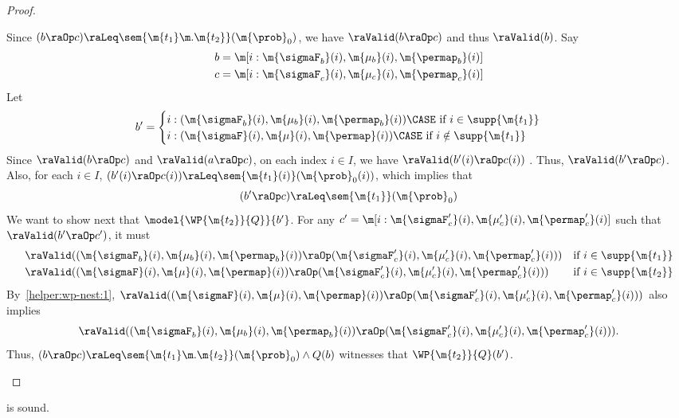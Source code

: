 \documentclass[acmsmall,nonacm,screen,appendix]{acmart}
\begin{document}
\begin{proof}
\begin{itemize}
      Since $(b \raOp c) \raLeq \sem{\m{t_1} \m. \m{t_2}}(\m{\prob}_0)
      $, we have $\raValid(b \raOp c)$ and thus $\raValid(b)$. Say
      \begin{align*}
        b &= \m[i: \m{\sigmaF_b}(i), \m{\mu_b}(i), \m{\permap_b}(i)] \\
        c &= \m[i: \m{\sigmaF_c}(i), \m{\mu_c}(i), \m{\permap_c}(i)]
\end{align*}
      Let
      \begin{align*}
        b' &=
        \begin{cases}
          i:  (\m{\sigmaF_b}(i), \m{\mu_b}(i), \m{\permap_b}(i)) \CASE \text{ if $i \in \supp{\m{t_1}}$} \\
          i : (\m{\sigmaF}(i), \m{\mu}(i), \m{\permap}(i)) \CASE \text{ if $i \notin \supp{\m{t_1}}$ }
        \end{cases}
      \end{align*}
      Since $\raValid(b \raOp c)$ and  $\raValid(a \raOp c)$,
      on each index $i \in I$, we have $\raValid(b'(i) \raOp c(i))$  .
      Thus, $\raValid(b' \raOp c)$.
      Also, for each $i \in I$,
      $(b'(i) \raOp c(i)) \raLeq \sem{\m{t_1}(i)}(\m{\prob}_0(i))$,
      which implies that
      \[
          (b' \raOp c) \raLeq \sem{\m{t_1}}(\m{\prob}_0)
      \]
      We want to show next that
      $\model{\WP {\m{t_2}} {Q}}{b'}$.
      For any $c' = \m[i: \m{\sigmaF'_c}(i), \m{\mu'_c}(i), \m{\permap'_c}(i)]$
      such that $\raValid(b' \raOp c')$,
      it must
      \begin{align*}
        &\raValid((\m{\sigmaF_b}(i), \m{\mu_b}(i), \m{\permap_b}(i)) \raOp (\m{\sigmaF'_c}(i), \m{\mu'_c}(i), \m{\permap'_c}(i)))  &\text{if } i \in \supp{\m{t_1}} \\
        &\raValid((\m{\sigmaF}(i), \m{\mu}(i), \m{\permap}(i)) \raOp (\m{\sigmaF'_c}(i), \m{\mu'_c}(i), \m{\permap'_c}(i)))  &\text{if } i  \in \supp{\m{t_2}}
      \end{align*}
      By~\cref{helper:wp-nest:1},
      $\raValid((\m{\sigmaF}(i), \m{\mu}(i), \m{\permap}(i)) \raOp (\m{\sigmaF'_c}(i), \m{\mu'_c}(i), \m{\permap'_c}(i)))$
      also implies
      \[
        \raValid((\m{\sigmaF_b}(i), \m{\mu_b}(i), \m{\permap_b}(i)) \raOp (\m{\sigmaF'_c}(i), \m{\mu'_c}(i), \m{\permap'_c}(i))).
      \]
      Thus,
      $(b \raOp c) \raLeq \sem{\m{t_1} \m. \m{t_2}}(\m{\prob}_0)
          \land
          Q(b)$
          witnesses that
           $\WP {\m{t_2}} {Q}(b')$.
  \end{itemize}
\end{proof}
 \begin{lemma}
\label{proof:wp-conj}
   is sound.
\end{lemma}
\end{document}
